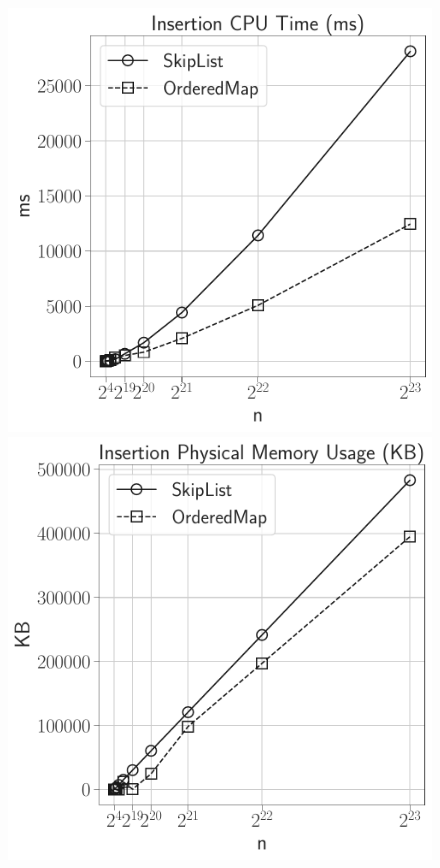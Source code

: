 \documentclass[12pt]{article}
\begin{document}
\begin{figure}[H]
	\centering

	\begin{minipage}{0.32\textwidth}
		\centering
		\includegraphics[width=\linewidth]{../notebook/plot/sl_insertion_cpu_time_(ms).pdf}
	\end{minipage}\hfill
	\begin{minipage}{0.32\textwidth}
		\centering
		\includegraphics[width=\linewidth]{../notebook/plot/sl_insertion_physical_memory_usage_(kb).pdf}

\end{minipage}
\end{figure}
\end{document}
